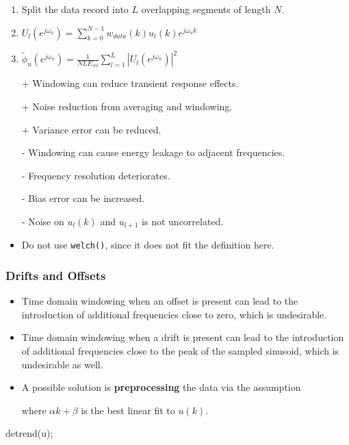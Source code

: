 \documentclass[10pt,a4paper]{scrartcl}
\newcommand{\ejon}{(e^{j\omega_n})}
\begin{document}
\begin{multicols*}{2}
\begin{enumerate}
\item Split the data record into $L$ overlapping segments of length $N$.
\item $U_l\ejon=\sum\limits_{k=0}^{N-1}w_{data}(k)u_l(k)e^{j\omega_n k}$
\item $\tilde{\phi}_u\ejon=\frac{1}{NLE_{scl}}\sum\limits_{l=1}^L\left|U_l\ejon\right|^2$
\end{enumerate}

\begin{itemize}
\item[+] Windowing can reduce transient response effects.
\item[+] Noise reduction from averaging and windowing.
\item[+] Variance error can be reduced.

\item[-] Windowing can cause energy leakage to adjacent frequencies.
\item[-] Frequency resolution deteriorates.
\item[-] Bias error can be increased.
\item[-] Noise on $u_l(k)$ and $u_{l+1}$ is not uncorrelated.
\item Do not use \verb+welch()+, since it does not fit the definition here.
\end{itemize}

\subsubsection{Drifts and Offsets}

\begin{itemize}
\item Time domain windowing when an offset is present can lead to the introduction of additional frequencies close to zero, which is undesirable.
\item Time domain windowing when a drift is present can lead to the introduction of additional frequencies close to the peak of the sampled sinusoid, which is undesirable as well.
\item A possible solution is \textbf{preprocessing} the data via the assumption


where $\alpha k+\beta$ is the best linear fit to $u(k)$.
\end{itemize}

\begin{TPMatlab}
detrend(u);
\end{TPMatlab}


\end{multicols*}
\end{document}
